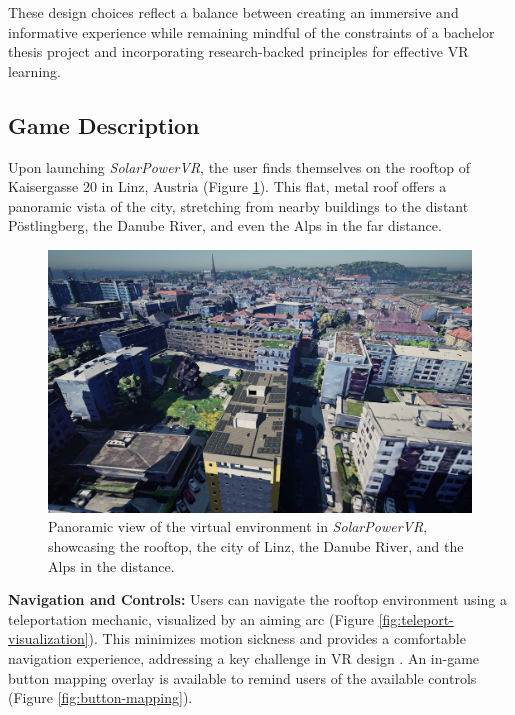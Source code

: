 \documentclass[draft, final]{vutinfth} %
\begin{document}
These design choices reflect a balance between creating an immersive and informative experience while remaining mindful of the constraints of a bachelor thesis project and incorporating research-backed principles for effective VR learning.

\subsection{Game Description}

Upon launching \textit{SolarPowerVR}, the user finds themselves on the rooftop of Kaisergasse 20 in Linz, Austria (Figure \ref{fig:environment-vista}). This flat, metal roof offers a panoramic vista of the city, stretching from nearby buildings to the distant Pöstlingberg, the Danube River, and even the Alps in the far distance. 

\begin{figure}
    \centering
    \includegraphics[width=\textwidth]{graphics/vista.jpg}
    \caption{Panoramic view of the virtual environment in \textit{SolarPowerVR}, showcasing the rooftop, the city of Linz, the Danube River, and the Alps in the distance.}
    \label{fig:environment-vista}
\end{figure}

\textbf{Navigation and Controls:} Users can navigate the rooftop environment using a teleportation mechanic, visualized by an aiming arc (Figure \ref{fig:teleport-visualization}). This minimizes motion sickness and provides a comfortable navigation experience, addressing a key challenge in VR design \cite{Winn2002Immersion}. An in-game button mapping overlay is available to remind users of the available controls (Figure \ref{fig:button-mapping}).
\end{document}
